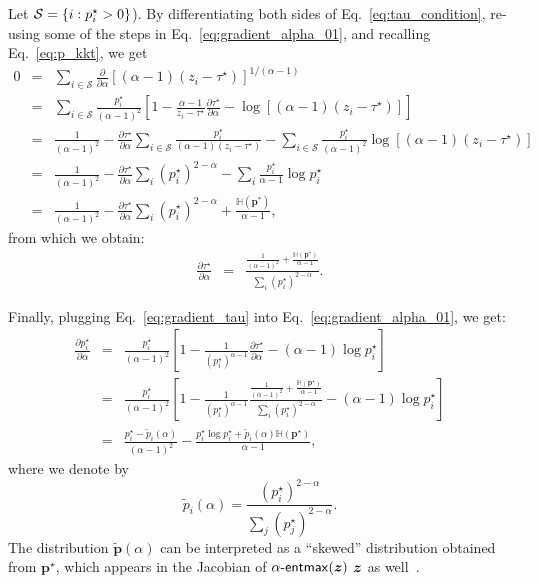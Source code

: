Let $\mathcal{S} = \{i: p^\star_i > 0 \}$).
By differentiating both sides of Eq.~\ref{eq:tau_condition}, re-using some of
the steps in Eq.~\ref{eq:gradient_alpha_01}, and recalling Eq.~\ref{eq:p_kkt},
we get
\begin{eqnarray}\label{eq:gradient_tau_implicit}
    0 &=& \sum_{i \in \mathcal{S}} \frac{\partial}{\partial \alpha} [(\alpha-1)(z_i - \tau^{\star})]^{1/(\alpha-1)}\nonumber\\
    &=& \sum_{i \in \mathcal{S}} \frac{p_i^{\star}}{(\alpha-1)^2} \left[1 - \frac{\alpha-1}{z_i - \tau^{\star}}\frac{\partial \tau^{\star}}{\partial \alpha} - \log[(\alpha-1)(z_i - \tau^{\star})] \right]\nonumber\\
    &=&  \frac{1}{(\alpha-1)^2} - \frac{\partial \tau^{\star}}{\partial \alpha} \sum_{i \in \mathcal{S}} \frac{p_i^{\star}}{(\alpha - 1)(z_i - \tau^{\star})} - \sum_{i \in \mathcal{S}} \frac{p_i^{\star}}{(\alpha-1)^2} \log[(\alpha-1)(z_i - \tau^{\star})] \nonumber\\
    &=&  \frac{1}{(\alpha-1)^2} - \frac{\partial \tau^{\star}}{\partial \alpha} \sum_{i} (p_i^{\star})^{2-\alpha} - \sum_{i} \frac{p_i^{\star}}{\alpha-1} \log p_i^{\star}\nonumber\\
    &=&  \frac{1}{(\alpha-1)^2} - \frac{\partial \tau^{\star}}{\partial \alpha} \sum_{i} (p_i^{\star})^{2-\alpha} + \frac{\mathbb H(\bm{p}^*)}{\alpha-1},
\end{eqnarray}
from which we obtain:
\begin{eqnarray}\label{eq:gradient_tau}
    \frac{\partial \tau^{\star}}{\partial \alpha} &=& \frac{\frac{1}{(\alpha-1)^2} + \frac{\mathbb H(\bm{p}^{\star})}{\alpha-1}}{\sum_i (p_i^{\star})^{2-\alpha}}.
\end{eqnarray}

Finally, plugging Eq.~\ref{eq:gradient_tau} into Eq.~\ref{eq:gradient_alpha_01}, we get:
\begin{eqnarray}\label{eq:gradient_alpha}
    \frac{\partial p_i^{\star}}{\partial \alpha} &=&  \frac{p_i^{\star}}{(\alpha-1)^2} \left[1 - \frac{1}{(p_i^{\star})^{\alpha-1}}\frac{\partial \tau^{\star}}{\partial \alpha} - (\alpha-1)\log p_i^{\star} \right]\nonumber\\
    &=&  \frac{p_i^{\star}}{(\alpha-1)^2} \left[1 - \frac{1}{(p_i^{\star})^{\alpha-1}}\frac{\frac{1}{(\alpha-1)^2} + \frac{\mathbb H(\bm{p}^{\star})}{\alpha-1}}{\sum_i (p_i^{\star})^{2-\alpha}} - (\alpha-1)\log p_i^{\star} \right]\nonumber\\
    &=& \frac{p_i^{\star} - \tilde{p}_i(\alpha)}{(\alpha-1)^2} - \frac{p_i^{\star}\log p_i^{\star} + \tilde{p}_i(\alpha)\mathbb H(\bm{p}^{\star})}{\alpha-1},
\end{eqnarray}
where we denote by
\begin{equation}
    \tilde{p}_i(\alpha) = \frac{(p_i^{\star})^{2-\alpha}}{\sum_j (p_j^{\star})^{2-\alpha}}.
\end{equation}
The distribution $\tilde{\bm{p}}(\alpha)$ can be interpreted as a ``skewed''
distribution obtained from $\bm{p}^{\star}$, which appears in the Jacobian of
$\mathop{\mathsf{\alpha}\textnormal{-}\mathsf{entmax}}(\bm{z})$ \wrt $\bm{z}$ as well~\cite{entmax}.


